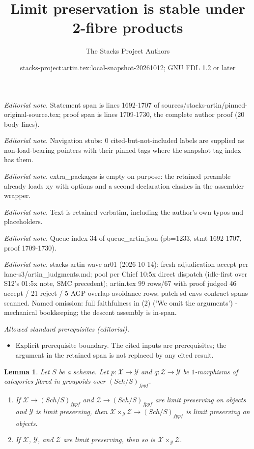 \documentclass[10pt,a4paper]{amsart}
\title{Limit preservation is stable under 2-fibre products}
\author{The Stacks Project Authors}
\date{stacks-project:artin.tex:local-snapshot-20261012; GNU FDL 1.2 or later}
\theoremstyle{plain}
\newtheorem{lemma}[subsection]{Lemma}
\theoremstyle{definition}
\theoremstyle{remark}
\numberwithin{equation}{subsection}
\def\Sch{\mathit{Sch}}
\begin{document}
\maketitle
\noindent\textit{Editorial note.} Statement span is lines 1692-1707 of sources/stacks-artin/pinned-original-source.tex; proof span is lines 1709-1730, the complete author proof (20 body lines).\par\medskip
\noindent\textit{Editorial note.} Navigation stubs: 0 cited-but-not-included labels are supplied as non-load-bearing pointers with their pinned tags where the snapshot tag index has them.\par\medskip
\noindent\textit{Editorial note.} extra\_packages is empty on purpose: the retained preamble already loads xy with options and a second declaration clashes in the assembler wrapper.\par\medskip
\noindent\textit{Editorial note.} Text is retained verbatim, including the author's own typos and placeholders.\par\medskip
\noindent\textit{Editorial note.} Queue index 34 of queue\_artin.json (pb=1233, stmt 1692-1707, proof 1709-1730).\par\medskip
\noindent\textit{Editorial note.} stacks-artin wave ar01 (2026-10-14): fresh adjudication accept per lane-s3/artin\_judgments.md; pool per Chief 10:5x direct dispatch (idle-first over S12's 01:5x note, SMC precedent); artin.tex 99 rows/67 with proof judged 46 accept / 21 reject / 5 AGP-overlap avoidance rows; patch-sd-envs contract spans scanned. Named omission: full faithfulness in (2) ('We omit the arguments') - mechanical bookkeeping; the descent assembly is in-span.\par\medskip
\noindent\textit{Allowed standard prerequisites (editorial).}\begin{itemize}
\item Explicit prerequisite boundary. The cited inputs are prerequisites; the argument in the retained span is not replaced by any cited result.
\end{itemize}\medskip
\begin{lemma}
\label{lemma-fibre-product-limit-preserving}
Let $S$ be a scheme. Let $p : \mathcal{X} \to \mathcal{Y}$ and
$q : \mathcal{Z} \to \mathcal{Y}$ be $1$-morphisms of categories
fibred in groupoids over $(\Sch/S)_{fppf}$.
\begin{enumerate}
\item If $\mathcal{X} \to (\Sch/S)_{fppf}$ and
$\mathcal{Z} \to (\Sch/S)_{fppf}$ are limit preserving on objects and
$\mathcal{Y}$ is limit preserving, then
$\mathcal{X} \times_\mathcal{Y} \mathcal{Z} \to (\Sch/S)_{fppf}$ is
limit preserving on objects.
\item If $\mathcal{X}$, $\mathcal{Y}$,
and $\mathcal{Z}$ are limit preserving, then so
is $\mathcal{X} \times_\mathcal{Y} \mathcal{Z}$.
\end{enumerate}
\end{lemma}
\end{document}
